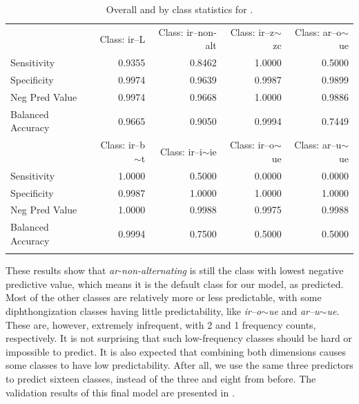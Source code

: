 \begin{table}
\begin{tabular}{lrrrr}
 & Class: ir--L &Class: ir--non-alt& Class: ir--z$\sim$zc& Class: ar--o$\sim$ue\\

    Sensitivity         &       0.9355 &            0.8462&          1.0000&          0.5000\\
    Specificity         &       0.9974 &            0.9639&          0.9987&          0.9899\\
    Neg Pred Value      &       0.9974 &            0.9668&          1.0000&          0.9886\\
    Balanced Accuracy   &       0.9665 &            0.9050&          0.9994&          0.7449\\

 &Class: ir--b$\sim$t& Class: ir--i$\sim$ie& Class: ir--o$\sim$ue& Class: ar--u$\sim$ue\\

    Sensitivity          &         1.0000&          0.5000&          0.0000&          0.0000\\
    Specificity          &         0.9987&          1.0000&          1.0000&          1.0000\\
    Neg Pred Value       &         1.0000&          0.9988&          0.9975&          0.9988\\
    Balanced Accuracy    &         0.9994&          0.7500&          0.5000&          0.5000\\
    \lspbottomrule
\end{tabular}
  \caption{Overall and by class statistics for .}
  \label{tab:spanish-verbs-class-v-stats}
\end{table}

These results show that \textit{ar-non-alternating} is still the class with lowest negative predictive value, which means it is the default class for our model, as predicted. Most of the other classes are relatively more or less predictable, with some diphthongization classes having little predictability, like \textit{ir--o$\sim$ue} and \textit{ar--u$\sim$ue}. These are, however, extremely infrequent, with 2 and 1 frequency counts, respectively. It is not surprising that such low-frequency classes should be hard or impossible to predict. It is also expected that combining both dimensions causes some classes to have low predictability. After all, we use the same three predictors to predict sixteen classes, instead of the three and eight from before. The validation results of this final model are presented in .%

